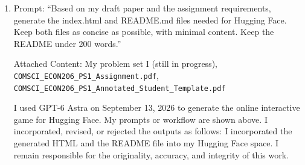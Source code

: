 \begin{enumerate}
Nobel foundation:~2014 — Jean Tirole. Analysis of market power and regulation.

Award URL:~{\def\UrlBreaks{\do a\do b\do c\do d\do e\do f\do g\do h\do i\do j\do k\do l\do m\do n\do o\do p\do q\do r\do s\do t\do u\do v\do w\do x\do y\do z\do A\do B\do C\do D\do E\do F\do G\do H\do I\do J\do K\do L\do M\do N\do O\do P\do Q\do R\do S\do T\do U\do V\do W\do X\do Y\do Z\do 0\do 1\do 2\do 3\do 4\do 5\do 6\do 7\do 8\do 9\do /\do -\do _\do .\do ?\do =\do &}\url{https://www.nobelprize.org/prizes/economic-sciences/2014/summary/}}”

Attached content: My intellectual statement I, my intellectual statement II, my problem set I(still in progress) and the example teaser figure in professor’s problem set I template.

I used GPT-6 Astra on September 20, 2026 to generate the teaser figure. My prompts or workflow are shown above. I incorporated, revised, or rejected the outputs as follows: I incorporated the teaser figure generated by AI into my essay. I remain responsible for the originality, accuracy, and integrity of this work.


\item Prompt: “Based on my draft paper and the assignment requirements, generate the index.html and README.md files needed for Hugging Face. Keep both files as concise as possible, with minimal content. Keep the README under 200 words.”

Attached Content: My problem set I (still in progress), {\def\UrlBreaks{\do a\do b\do c\do d\do e\do f\do g\do h\do i\do j\do k\do l\do m\do n\do o\do p\do q\do r\do s\do t\do u\do v\do w\do x\do y\do z\do A\do B\do C\do D\do E\do F\do G\do H\do I\do J\do K\do L\do M\do N\do O\do P\do Q\do R\do S\do T\do U\do V\do W\do X\do Y\do Z\do 0\do 1\do 2\do 3\do 4\do 5\do 6\do 7\do 8\do 9\do /\do -\do _\do .\do ?\do =\do &}\nolinkurl{COMSCI_ECON206_PS1_Assignment.pdf}}, {\def\UrlBreaks{\do a\do b\do c\do d\do e\do f\do g\do h\do i\do j\do k\do l\do m\do n\do o\do p\do q\do r\do s\do t\do u\do v\do w\do x\do y\do z\do A\do B\do C\do D\do E\do F\do G\do H\do I\do J\do K\do L\do M\do N\do O\do P\do Q\do R\do S\do T\do U\do V\do W\do X\do Y\do Z\do 0\do 1\do 2\do 3\do 4\do 5\do 6\do 7\do 8\do 9\do /\do -\do _\do .\do ?\do =\do &}\nolinkurl{COMSCI_ECON206_PS1_Annotated_Student_Template.pdf}}

I used GPT-6 Astra on September 13, 2026 to generate the online interactive game for Hugging Face. My prompts or workflow are shown above. I incorporated, revised, or rejected the outputs as follows: I incorporated the generated HTML and the README file into my Hugging Face space. I remain responsible for the originality, accuracy, and integrity of this work.



\end{enumerate}
